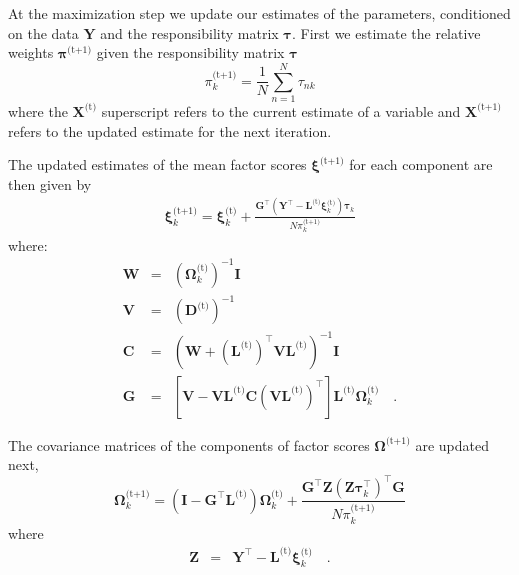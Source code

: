 \documentclass[twocolumn]{aastex61}
\newcommand{\vect}[1]{\boldsymbol{\mathbf{#1}}}
\renewcommand{\vec}[1]{\vect{#1}}
\newcommand{\weight}{\pi}
\newcommand{\data}{\textbf{Y}}
\newcommand{\vecdata}{\vec\data}
\newcommand{\nextstep}{^\textrm{(t+1)}}
\newcommand{\thisstep}{^\textrm{(t)}}
\newcommand{\transpose}{^\intercal}
\newcommand{\eye}{\textbf{I}}
\newcommand{\factorloads}{\textbf{L}}
\newcommand{\specificvariance}{\vec{D}}
\newcommand{\scoremeans}{\vec\xi}
\newcommand{\scorecovs}{\vec\Omega}
\newcommand{\NumData}{N}
\newcommand{\numdata}{n}
\newcommand{\numcomponents}{k}
\begin{document}
At the maximization step we update our estimates of the parameters,
conditioned on the data $\vecdata$ and the responsibility matrix $\vec\tau$.
First we estimate the relative weights $\vec\weight\nextstep$ given
the responsibility matrix $\vec\tau$
\begin{equation}
	\weight_\numcomponents\nextstep = \frac{1}{\NumData} \sum_{\numdata=1}^{\NumData}\tau_{\numdata\numcomponents}
\end{equation}
\noindent{}where the $\vec{X}\thisstep$ superscript refers to the current estimate of a variable
and $\vec{X}\nextstep$ refers to the updated estimate for the next iteration.



The updated estimates of the mean factor scores 
$\scoremeans\nextstep$ for each component are then given by
\begin{eqnarray}
	\scoremeans_\numcomponents\nextstep = \scoremeans_\numcomponents\thisstep + \frac{\vec{G}\transpose(\vecdata\transpose - \factorloads\thisstep\scoremeans_\numcomponents\thisstep)\vec\tau_\numcomponents}{\NumData\weight_\numcomponents\nextstep}
\end{eqnarray}
\noindent{}where:
\begin{eqnarray}
	\vec{W} &=& (\scorecovs_\numcomponents\thisstep)^{-1}\eye \\
	\vec{V} &=& \left(\specificvariance\thisstep\right)^{-1} \\
	\vec{C} &=& (\vec{W} + (\factorloads\thisstep)\transpose\vec{V}\factorloads\thisstep)^{-1}\eye \\
	\vec{G} &=& \left[\vec{V} - \vec{V}\factorloads\thisstep\vec{C}\left(\vec{V}\factorloads\thisstep\right)\transpose\right]\factorloads\thisstep\scorecovs_k\thisstep \quad .
\end{eqnarray}

The covariance matrices of the components of factor scores $\scorecovs\nextstep$
are updated next,
\begin{equation}
	\scorecovs_\numcomponents\nextstep = \left(\eye - \vec{G}\transpose\factorloads\thisstep\right)\scorecovs_\numcomponents\thisstep + \frac{\vec{G}\transpose\vec{Z}\left(\vec{Z}\vec\tau_\numcomponents\transpose\right)\transpose\vec{G}}{N\weight_\numcomponents\nextstep}
\end{equation}
\noindent{}where
\begin{eqnarray}
	\vec{Z} &=& \vecdata\transpose - \factorloads\thisstep\scoremeans_\numcomponents\thisstep \quad .
\end{eqnarray}
\end{document}
